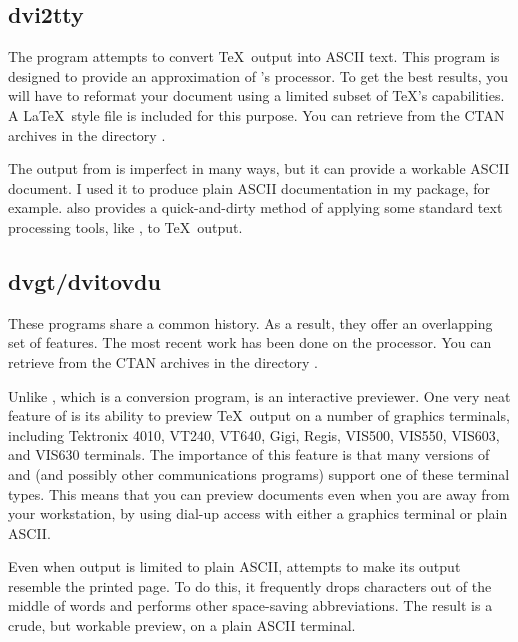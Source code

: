 \subsection{dvi2tty}

The  
program attempts 
to convert \TeX\ output into 
ASCII text.  This program is designed to provide an approximation of
's  processor.
To get the best results,
you will have to reformat your document using a limited subset of 
\TeX's capabilities.  A \LaTeX\ style file is included for this purpose.
You can retrieve  from the CTAN archives in
the directory .

The output from  is imperfect in many ways, but it can
provide a workable ASCII document.  I used it to produce plain ASCII
documentation in my  package, for example.  
 also provides a quick-and-dirty method of applying some
standard text processing tools, like , to \TeX\ output.

\subsection{dvgt/dvitovdu}

These 
programs share a common history.  As a result, they offer an
overlapping set of features.  The most recent work has been done on the
 processor.
You can retrieve  from the CTAN archives in the directory
.

Unlike , which is a conversion program,  is
an interactive previewer.  
One very neat feature of  is its ability to preview \TeX\
output on a number of graphics terminals, including Tektronix 4010,
VT240, VT640, Gigi, Regis, VIS500, VIS550, VIS603, and VIS630 terminals.  
The importance of this
feature is that many versions of  
and \ixx{\program{NCSA Telnet}}{NCSA Telnet} 
(and possibly other communications programs) support one of these terminal 
types.  This means that you can preview documents 
even when you are away from your workstation, by using dial-up access with either
a graphics terminal or plain ASCII. 

Even when output is limited to plain ASCII,
 attempts to make its output resemble the printed page.
To do this, it frequently drops characters out of the middle of words
and performs other space-saving abbreviations.  The result is a crude, but
workable preview, on a plain ASCII terminal.

